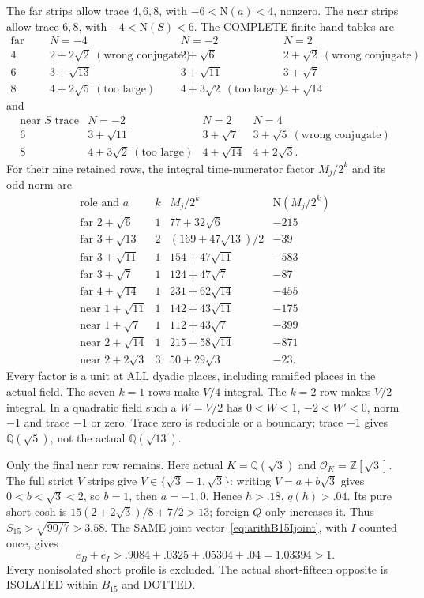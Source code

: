 The far strips allow trace \(4,6,8\), with
\(-6<\mathrm N(a)<4\), nonzero.
The near strips allow trace \(6,8\), with
\(-4<\mathrm N(S)<6\).
The COMPLETE finite hand tables are
\[
\begin{array}{c|ccc}
 \text{far trace}&N=-4&N=-2&N=2\\ \hline
4&2+2\sqrt2\ (\text{wrong conjugate})&2+\sqrt6&
        2+\sqrt2\ (\text{wrong conjugate})\\
6&3+\sqrt{13}&3+\sqrt{11}&3+\sqrt7\\
8&4+2\sqrt5\ (\text{too large})&
        4+3\sqrt2\ (\text{too large})&4+\sqrt{14}
\end{array}
\]
and
\[
\begin{array}{c|ccc}
 \text{near }S\text{ trace}&N=-2&N=2&N=4\\ \hline
6&3+\sqrt{11}&3+\sqrt7&3+\sqrt5\ (\text{wrong conjugate})\\
8&4+3\sqrt2\ (\text{too large})&4+\sqrt{14}&4+2\sqrt3 .
\end{array}
\]
For their nine retained rows, the integral time-numerator
factor \(M_j/2^k\) and its odd norm are
\[
\begin{array}{c|c|c|r}
 \text{role and }a&k&M_j/2^k&\mathrm N(M_j/2^k)\\ \hline
 \text{far }2+\sqrt6&1&77+32\sqrt6&-215\\
 \text{far }3+\sqrt{13}&2&(169+47\sqrt{13})/2&-39\\
 \text{far }3+\sqrt{11}&1&154+47\sqrt{11}&-583\\
 \text{far }3+\sqrt7&1&124+47\sqrt7&-87\\
 \text{far }4+\sqrt{14}&1&231+62\sqrt{14}&-455\\
 \text{near }1+\sqrt{11}&1&142+43\sqrt{11}&-175\\
 \text{near }1+\sqrt7&1&112+43\sqrt7&-399\\
 \text{near }2+\sqrt{14}&1&215+58\sqrt{14}&-871\\
 \text{near }2+2\sqrt3&3&50+29\sqrt3&-23 .
\end{array}
\]
Every factor is a unit at ALL dyadic places,
including ramified places in the actual field.
The seven \(k=1\) rows make \(V/4\) integral.
The \(k=2\) row makes \(V/2\) integral.
In a quadratic field such a \(W=V/2\) has
\(0<W<1\), \(-2<W'<0\), norm \(-1\)
and trace \(-1\) or zero.
Trace zero is reducible or a boundary;
trace \(-1\) gives \(\mathbb Q(\sqrt5)\),
not the actual \(\mathbb Q(\sqrt{13})\).

Only the final near row remains.
Here actual \(K=\mathbb Q(\sqrt3)\) and
\(\mathcal O_K=\mathbb Z[\sqrt3]\).
The full strict \(V\) strips give
\(V\in\{\sqrt3-1,\sqrt3\}\):
writing \(V=a+b\sqrt3\) gives \(0<b<\sqrt3<2\),
so \(b=1\), then \(a=-1,0\).
Hence \(h>.18\), \(q(h)>.04\).
Its pure short cosh is
\(15(2+2\sqrt3)/8+7/2>13\);
foreign \(Q\) only increases it.
Thus \(S_{15}>\sqrt{90/7}>3.58\).
The SAME joint vector~\eqref{eq:arithB15Ijoint},
with \(I\) counted once, gives
\[
                   e_B+e_I>.9084+.0325+.05304+.04
                                =1.03394>1.
\]
Every nonisolated short profile is excluded.
The actual short-fifteen opposite is ISOLATED
within \(B_{15}\) and DOTTED.

